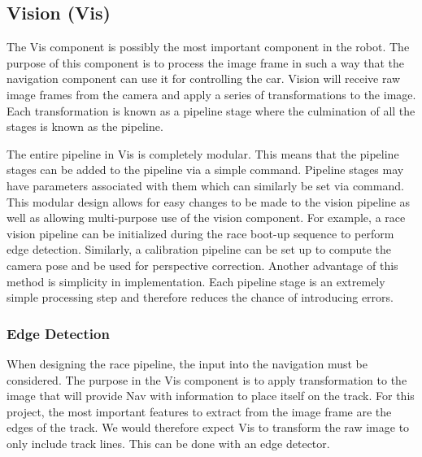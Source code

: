 \documentclass{article}
\begin{document}
\subsection{Vision (Vis)}

The Vis component is possibly the most important component in the robot. The purpose
of this component is to process the image frame in such a way that the navigation
component can use it for controlling the car. Vision will receive raw image frames
from the camera and apply a series of transformations to the image. Each transformation
is known as a pipeline stage where the culmination of all the stages is known as the
pipeline.

The entire pipeline in Vis is completely modular. This means that the pipeline stages
can be added to the pipeline via a simple command. Pipeline stages may have parameters
associated with them which can similarly be set via command. This modular design allows
for easy changes to be made to the vision pipeline as well as allowing multi-purpose
use of the vision component. For example, a race vision pipeline can be initialized
during the race boot-up sequence to perform edge detection. Similarly, a calibration
pipeline can be set up to compute the camera pose and be used for perspective correction. Another advantage of this method is simplicity in implementation. Each pipeline stage is an extremely simple processing step and therefore reduces the chance of introducing errors.

\subsubsection{Edge Detection}

When designing the race pipeline, the input into the navigation must be considered. The purpose in the Vis component is to apply transformation to the image that will provide Nav with information to place itself on the track. For this project, the most important features to extract from the image frame are the edges of the track. We would therefore expect Vis to transform the raw image to only include track lines. This can be done with an edge detector.
\end{document}

